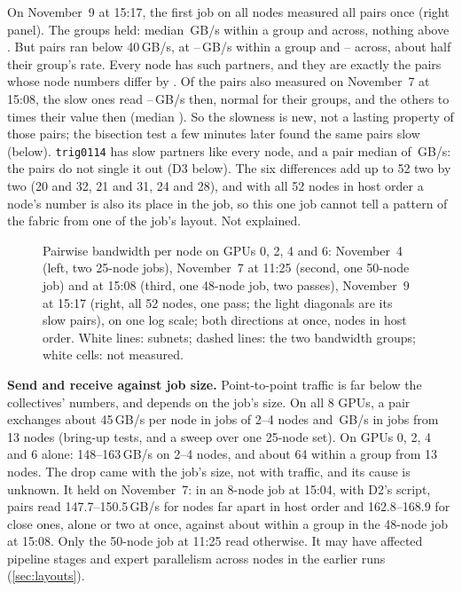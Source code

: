 On November~9 at 15:17, the first job on all \TriNineNodes{} nodes measured all \TriNinePairs{} pairs once (right panel). The groups held: median \TriNineWithin\,GB/s within a group and \TriNineAcross{} across, nothing above \TriNineWithinHi. But \TriNineLow{} pairs ran below 40\,GB/s, at \TriNineLowWithinLo--\TriNineLowWithinHi\,GB/s within a group and \TriNineLowAcrossLo--\TriNineLowAcrossHi{} across, about half their group's rate. Every node has \TriNineLowPerNode{} such partners, and they are exactly the pairs whose node numbers differ by \TriNineLowDiffs. Of the \TriNineCommon{} pairs also measured on November~7 at 15:08, the \TriNineLowCommon{} slow ones read \TriNineLowThenLo--\TriNineLowThenHi\,GB/s then, normal for their groups, and the others \TriNineRatioLo{} to \TriNineRatioHi{} times their value then (median \TriNineRatioMed). So the slowness is new, not a lasting property of those pairs; the bisection test a few minutes later found the same pairs slow (below). \texttt{trig0114} has \TriNineLowOdd{} slow partners like every node, and a pair median of \TriNineOddMed\,GB/s: the pairs do not single it out (D3 below). The six differences add up to 52 two by two (20 and 32, 21 and 31, 24 and 28), and with all 52 nodes in host order a node's number is also its place in the job, so this one job cannot tell a pattern of the fabric from one of the job's layout. Not explained.

\begin{figure}[h]
  \centering{}
  \caption{Pairwise bandwidth per node on GPUs 0, 2, 4 and 6: November~4 (left, two 25-node jobs), November~7 at 11:25 (second, one 50-node job) and at 15:08 (third, one 48-node job, two passes), November~9 at 15:17 (right, all 52 nodes, one pass; the light diagonals are its slow pairs), on one log scale; both directions at once, nodes in host order. White lines: subnets; dashed lines: the two bandwidth groups; white cells: not measured. }
  \label{fig:pair_matrix}
\end{figure}

\textbf{Send and receive against job size.} Point-to-point traffic is far below the collectives' numbers, and depends on the job's size. On all 8 GPUs, a pair exchanges about 45\,GB/s per node in jobs of 2--4 nodes and \TriPairAllGpus\,GB/s in jobs from 13 nodes (bring-up tests, and a sweep over one 25-node set). On GPUs 0, 2, 4 and 6 alone: 148--163\,GB/s on 2--4 nodes, and about 64 within a group from 13 nodes. The drop came with the job's size, not with traffic, and its cause is unknown. It held on November~7: in an 8-node job at 15:04, with D2's script, pairs read 147.7--150.5\,GB/s for nodes far apart in host order and 162.8--168.9 for close ones, alone or two at once, against about \TriAgainWithin{} within a group in the 48-node job at 15:08. Only the 50-node job at 11:25 read otherwise. It may have affected pipeline stages and expert parallelism across nodes in the earlier runs (\cref{sec:layouts}).

